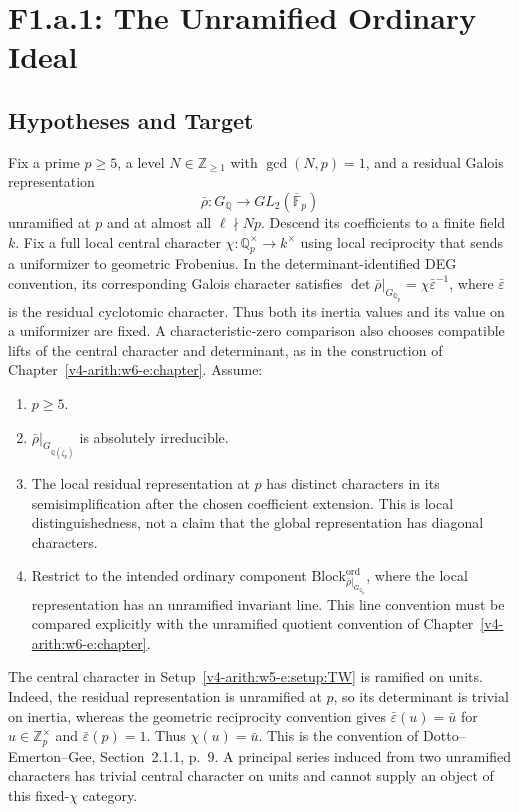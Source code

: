 \section{F1.a.1: The Unramified Ordinary Ideal}
\label{v4-arith:w5-e:f1a1}

\subsection{Hypotheses and Target}

\begin{setup}
\label{v4-arith:w5-e:setup:TW}
Fix a prime \(p\geq 5\), a level \(N\in\mathbb{Z}_{\geq 1}\) with
\(\gcd(N,p)=1\), and a residual Galois representation
\[
\bar\rho\colon G_{\mathbb{Q}}\to GL_{2}(\overline{\mathbb{F}}_{p})
\]
unramified at $p$ and at almost all $\ell\nmid Np$. Descend its
coefficients to a finite field $k$. Fix a full local central character
$\chi:\mathbb Q_p^\times\to k^\times$ using local reciprocity that
sends a uniformizer to geometric Frobenius. In the determinant-identified
DEG convention, its corresponding Galois character satisfies
$\det\bar\rho|_{G_{\mathbb Q_p}}=\chi\bar\varepsilon^{-1}$,
where $\bar\varepsilon$ is the residual cyclotomic character.
Thus both its inertia values and its value on a uniformizer are fixed.
A characteristic-zero comparison also chooses compatible lifts of the
central character and determinant, as in the construction of
Chapter~\ref{v4-arith:w6-e:chapter}. Assume:
\begin{enumerate}
\item[\textbf{(TW1)}] $p\ge5$.
\item[\textbf{(TW2)}] $\bar\rho|_{G_{\mathbb Q(\zeta_p)}}$ is
absolutely irreducible.
\item[\textbf{(TW3)}] The local residual representation at $p$ has
distinct characters in its semisimplification after the chosen
coefficient extension. This is local distinguishedness, not a claim
that the global representation has diagonal characters.
\item[\textbf{(TW4)}] Restrict to the intended ordinary component
$\mathrm{Block}^{\mathrm{ord}}_{\bar\rho|_{G_{\mathbb Q_p}}}$,
where the local representation has an unramified invariant line.
This line convention must be compared explicitly with the unramified
quotient convention of Chapter~\ref{v4-arith:w6-e:chapter}.
\end{enumerate}
\end{setup}

The central character in Setup~\ref{v4-arith:w5-e:setup:TW} is
ramified on units. Indeed, the residual representation is unramified
at $p$, so its determinant is trivial on inertia, whereas the geometric
reciprocity convention gives
$\bar\varepsilon(u)=\bar u$ for $u\in\mathbb Z_p^\times$ and
$\bar\varepsilon(p)=1$. Thus $\chi(u)=\bar u$. This is the convention of
Dotto--Emerton--Gee, Section~2.1.1, p.~9. A principal series induced
from two unramified characters has trivial central character on units
and cannot supply an object of this fixed-$\chi$ category.

